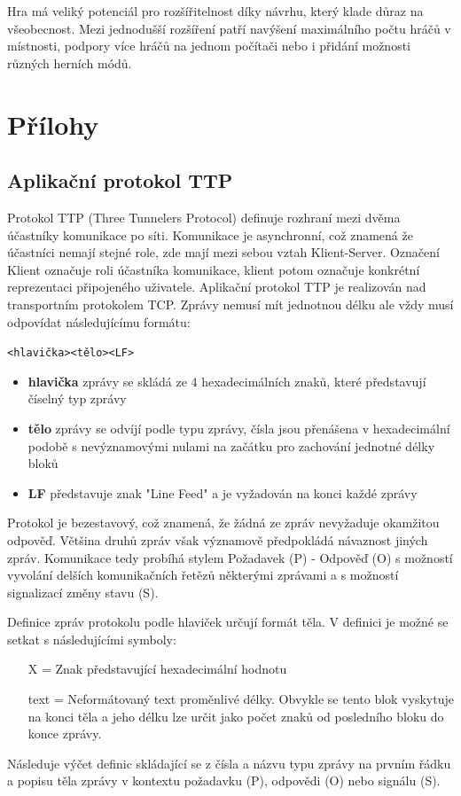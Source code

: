 \documentclass[12pt,a4paper]{article}
\let\oldsection\section
\renewcommand\section{\clearpage\oldsection}
\begin{document}
Hra má veliký potenciál pro rozšířitelnost díky návrhu, který klade důraz na všeobecnost. Mezi jednodušší rozšíření patří navýšení maximálního počtu hráčů v místnosti, podpory více hráčů na jednom počítači nebo i přidání možnosti různých herních módů.

\section{Přílohy}
\subsection{Aplikační protokol TTP}
Protokol TTP (Three Tunnelers Protocol) definuje rozhraní mezi dvěma účastníky komunikace po síti. Komunikace je asynchronní, což znamená že účastníci nemají stejné role, zde mají mezi sebou vztah Klient-Server. Označení Klient označuje roli účastníka komunikace, klient potom označuje konkrétní reprezentaci připojeného uživatele.
Aplikační protokol TTP je realizován nad transportním protokolem TCP. Zprávy nemusí mít jednotnou délku ale vždy musí odpovídat následujícímu formátu:
\begin{center}
\texttt{<hlavička><tělo><LF>}
\end{center}
\begin{itemize}
\setlength\itemsep{0em}
\item \textbf{hlavička} zprávy se skládá ze 4 hexadecimálních znaků, které představují číselný typ zprávy
\item \textbf{tělo} zprávy se odvíjí podle typu zprávy, čísla jsou přenášena v hexadecimální podobě s nevýznamovými nulami na začátku pro zachování jednotné délky bloků
\item \textbf{LF} představuje znak "Line Feed" a je vyžadován na konci každé zprávy
\end{itemize}

Protokol je bezestavový, což znamená, že žádná ze zpráv nevyžaduje okamžitou odpověď. Většina druhů zpráv však významově předpokládá návaznost jiných zpráv.
Komunikace tedy probíhá stylem Požadavek (P) - Odpověď (O) s možností vyvolání delších komunikačních řetězů některými zprávami a s možností signalizací změny stavu (S).

Definice zpráv protokolu podle hlaviček určují formát těla. V definici je možné se setkat s následujícími symboly:
\begin{itemize}
\item[X] = Znak představující hexadecimální hodnotu
\item[text] = Neformátovaný text proměnlivé délky. Obvykle se tento blok vyskytuje na konci těla a jeho délku lze určit jako počet znaků od posledního bloku do konce zprávy.
\end{itemize}
Následuje výčet definic skládající se z čísla a názvu typu zprávy na prvním řádku a popisu těla zprávy v kontextu požadavku (P), odpovědi (O) nebo signálu (S).
\newpage
\end{document}
